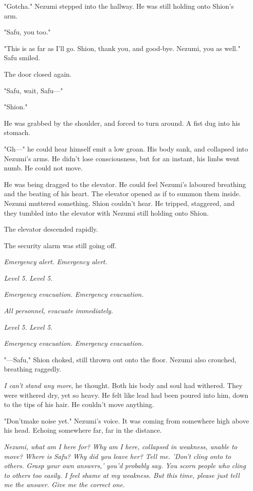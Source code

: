 "Gotcha." Nezumi stepped into the hallway. He was still holding onto
Shion's arm.

"Safu, you too."

"This is as far as I'll go. Shion, thank you, and good-bye. Nezumi, you
as well." Safu smiled.

The door closed again.

"Safu, wait, Safu---"

"Shion."

He was grabbed by the shoulder, and forced to turn around. A fist dug
into his stomach.

"Gh---" he could hear himself emit a low groan. His body sank, and
collapsed into Nezumi's arms. He didn't lose consciousness, but for an
instant, his limbs went numb. He could not move.

He was being dragged to the elevator. He could feel Nezumi's laboured
breathing and the beating of his heart. The elevator opened as if to
summon them inside. Nezumi muttered something. Shion couldn't hear. He
tripped, staggered, and they tumbled into the elevator with Nezumi still
holding onto Shion.

The elevator descended rapidly.~

The security alarm was still going off.

\emph{Emergency alert. Emergency alert.}

\emph{Level 5. Level 5.}

\emph{Emergency evacuation. Emergency evacuation.}

\emph{All personnel, evacuate immediately.}

\emph{Level 5. Level 5.}

\emph{Emergency evacuation. Emergency evacuation.}

"---Safu," Shion choked, still thrown out onto the floor. Nezumi also
crouched, breathing raggedly.

\emph{I can't stand any more}, he thought. Both his body and soul had withered.
They were withered dry, yet so heavy. He felt like lead had been poured
into him, down to the tips of his hair. He couldn't move anything.

"Don't\el make noise yet." Nezumi's voice. It was coming from somewhere
high above his head. Echoing somewhere far, far in the distance.

\emph{Nezumi, what am I here for? Why am I here, collapsed in weakness, unable
to move? Where is Safu? Why did you leave her? Tell me. 'Don't cling
onto to others. Grasp your own answers,' you'd probably say. You scorn
people who cling to others too easily. I feel shame at my weakness. But
this time, please just tell me the answer. Give me the correct one.}

